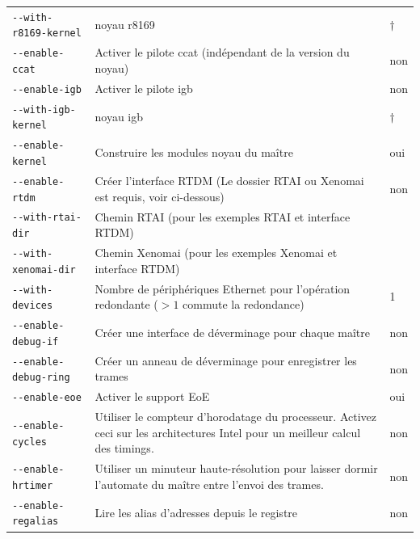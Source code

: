 \documentclass[a4paper,12pt,BCOR6mm,bibtotoc,idxtotoc]{scrbook}
\begin{document}
\begin{longtable}{l|p{}|l}
\lstinline+--with-r8169-kernel+ & noyau r8169 & $\dagger$\\

\lstinline+--enable-ccat+ & Activer le pilote ccat (ind\'ependant de
la version du noyau) & non\\

\lstinline+--enable-igb+ & Activer le pilote igb & non\\

\lstinline+--with-igb-kernel+ & noyau igb & $\dagger$\\

\hline

\lstinline+--enable-kernel+ & Construire les modules noyau du ma\^itre
& oui\\

\lstinline+--enable-rtdm+ & Cr\'eer l'interface RTDM (Le dossier RTAI
ou Xenomai est requis, voir ci-dessous) & non\\

\lstinline+--with-rtai-dir+ & Chemin RTAI (pour les exemples RTAI et
interface RTDM) & \\

\lstinline+--with-xenomai-dir+ & Chemin Xenomai (pour les exemples
Xenomai et interface RTDM) & \\

\lstinline+--with-devices+ & Nombre de p\'eriph\'eriques Ethernet pour
l'op\'eration redondante ($>1$ commute la redondance) & 1\\

\lstinline+--enable-debug-if+ & Cr\'eer une interface de d\'everminage pour
chaque ma\^itre & non\\

\lstinline+--enable-debug-ring+ & Cr\'eer un anneau de d\'everminage pour
enregistrer les trames & non\\

\lstinline+--enable-eoe+ & Activer le support EoE & oui\\

\lstinline+--enable-cycles+ & Utiliser le compteur d'horodatage du
processeur. Activez ceci sur les architectures Intel pour un meilleur
calcul des timings. & non\\

\lstinline+--enable-hrtimer+ & Utiliser un minuteur haute-r\'esolution
pour laisser dormir l'automate du ma\^itre entre l'envoi des trames. &
non\\

\lstinline+--enable-regalias+ & Lire les alias d'adresses depuis le
registre & non\\


\end{longtable}
\end{document}
